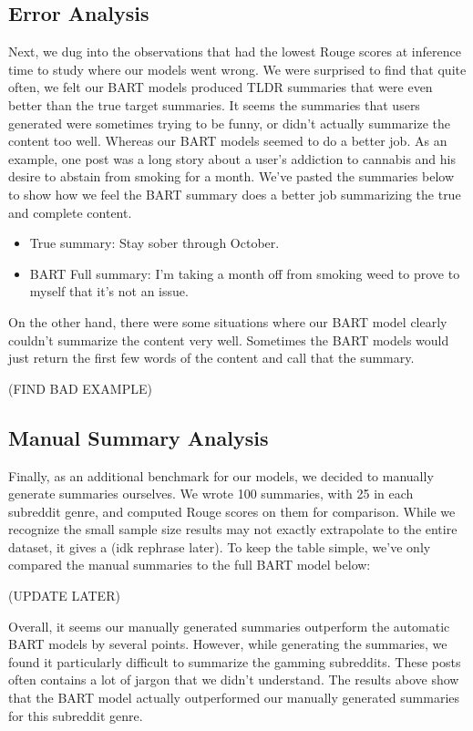 \documentclass[11pt,a4paper, twocolumn]{article}
\begin{document}
\subsection{Error Analysis}

Next, we dug into the observations that had the lowest Rouge scores at inference time to study where our models went wrong. 
We were surprised to find that quite often, we felt our BART models produced TLDR summaries that were even better than the true target summaries. 
It seems the summaries that users generated were sometimes trying to be funny, or didn't actually summarize the content too well. 
Whereas our BART models seemed to do a better job. As an example, one post was a long story about a user's addiction to cannabis and his desire to 
abstain from smoking for a month. 
We've pasted the summaries below to show how we feel the BART summary does a better job summarizing the true and complete content.

\begin{itemize}
  \item True summary: Stay sober through October.
  \item BART Full summary: I'm taking a month off from smoking weed to prove to myself that it's not an issue.
\end{itemize}


On the other hand, there were some situations where our BART model clearly couldn't summarize the content very well. 
Sometimes the BART models would just return the first few words of the content and call that the summary. 

(FIND BAD EXAMPLE)

\subsection{Manual Summary Analysis}

Finally, as an additional benchmark for our models, we decided to manually generate summaries ourselves. 
We wrote 100 summaries, with 25 in each subreddit genre, and computed Rouge scores on them for comparison. 
While we recognize the small sample size results may not exactly extrapolate to the entire dataset, 
it gives a (idk rephrase later).
To keep the table simple, we've only compared the manual summaries to the full BART model below:

(UPDATE LATER)

Overall, it seems our manually generated summaries outperform the automatic BART models by several points. 
However, while generating the summaries, we found it particularly difficult to summarize the gamming subreddits. 
These posts often contains a lot of jargon that we didn't understand. 
The results above show that the BART model actually outperformed our manually generated summaries for this subreddit genre. 
\end{document}
